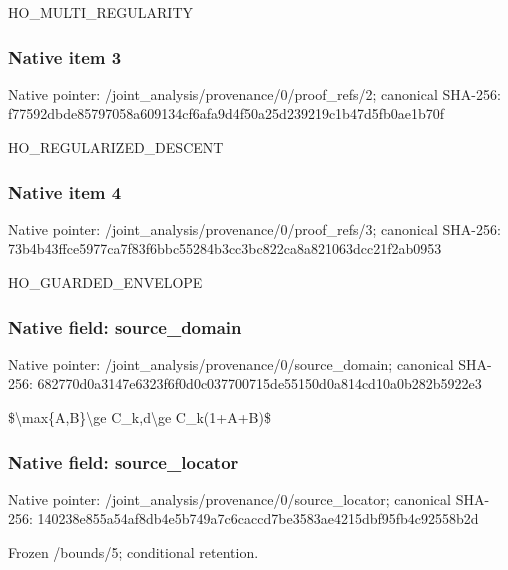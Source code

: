 \documentclass[10pt,a4paper]{article}
\begin{document}
\begingroup\raggedright\sloppy HO\_\allowbreak{}MULTI\_\allowbreak{}REGULARITY\par\endgroup

\subsubsection{Native item 3}
Native pointer: /joint\_\allowbreak{}analysis/provenance/0/proof\_\allowbreak{}refs/2; canonical SHA-256: f77592dbde85797058a609134cf6afa9d4f50a25d239219c1b47d5fb0ae1b70f

\begingroup\raggedright\sloppy HO\_\allowbreak{}REGULARIZED\_\allowbreak{}DESCENT\par\endgroup

\subsubsection{Native item 4}
Native pointer: /joint\_\allowbreak{}analysis/provenance/0/proof\_\allowbreak{}refs/3; canonical SHA-256: 73b4b43ffce5977ca7f83f6bbc55284b3cc3bc822ca8a821063dcc21f2ab0953

\begingroup\raggedright\sloppy HO\_\allowbreak{}GUARDED\_\allowbreak{}ENVELOPE\par\endgroup

\subsubsection{Native field: source\_\allowbreak{}domain}
Native pointer: /joint\_\allowbreak{}analysis/provenance/0/source\_\allowbreak{}domain; canonical SHA-256: 682770d0a3147e6323f6f0d0c037700715de55150d0a814cd10a0b282b5922e3

\begingroup\raggedright\sloppy \$\textbackslash{}max\{A,\allowbreak{}B\}\textbackslash{}ge C\_\allowbreak{}k,\allowbreak{}d\textbackslash{}ge C\_\allowbreak{}k(1+A+B)\$\par\endgroup

\subsubsection{Native field: source\_\allowbreak{}locator}
Native pointer: /joint\_\allowbreak{}analysis/provenance/0/source\_\allowbreak{}locator; canonical SHA-256: 140238e855a54af8db4e5b749a7c6caccd7be3583ae4215dbf95fb4c92558b2d

\begingroup\raggedright\sloppy Frozen /\allowbreak{}bounds/\allowbreak{}5;\allowbreak{} conditional retention.\par\endgroup
\end{document}

